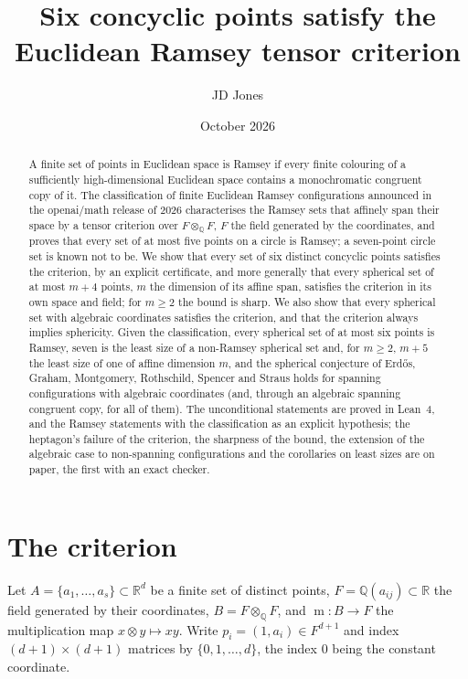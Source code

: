\documentclass[11pt]{article}
\title{Six concyclic points satisfy the Euclidean Ramsey tensor criterion}
\author{JD Jones}
\date{October 2026}
\theoremstyle{definition}
\theoremstyle{remark}
\newcommand{\R}{\mathbb{R}}
\newcommand{\Q}{\mathbb{Q}}
\newcommand{\B}{B}
\DeclareMathOperator{\m}{m}
\begin{document}
\maketitle

\begin{abstract}
A finite set of points in Euclidean space is Ramsey if every finite colouring of a sufficiently
high-dimensional Euclidean space contains a monochromatic congruent copy of it. The classification
of finite Euclidean Ramsey configurations announced in the openai/math release of 2026 characterises
the Ramsey sets that affinely span their space by a tensor criterion over $F \otimes_\Q F$, $F$ the
field generated by the coordinates, and proves that every set of at most five points on a circle is
Ramsey; a seven-point circle set is known not to be. We show that every set of six distinct
concyclic points satisfies the criterion, by an explicit certificate, and more generally that every
spherical set of at most $m + 4$ points, $m$ the dimension of its affine span, satisfies the
criterion in its own space and field; for $m \geq 2$ the bound is sharp. We also show that every spherical set with
algebraic coordinates satisfies the criterion, and that the criterion always implies sphericity.
Given the classification, every spherical set of at most six points is Ramsey, seven is the least
size of a non-Ramsey spherical set and, for $m \geq 2$, $m + 5$ the least size of one of affine dimension
$m$, and the
spherical conjecture of Erd\H{o}s, Graham, Montgomery, Rothschild, Spencer and Straus holds for
spanning configurations with algebraic coordinates (and, through an algebraic spanning congruent copy,
for all of them). The unconditional statements are proved in Lean~4, and the Ramsey statements with the
classification as an explicit hypothesis; the heptagon's failure of the criterion, the sharpness of the
bound, the extension of the algebraic case to non-spanning configurations and the corollaries on
least sizes are on paper, the first with an exact checker.
\end{abstract}

\section{The criterion}

Let $A = \{a_1, \dots, a_s\} \subset \R^d$ be a finite set of distinct points, $F = \Q(a_{ij}) \subset \R$
the field generated by their coordinates, $\B = F \otimes_\Q F$, and $\m \colon \B \to F$ the
multiplication map $x \otimes y \mapsto xy$. Write $p_i = (1, a_i) \in F^{d+1}$ and index
$(d+1) \times (d+1)$ matrices by $\{0, 1, \dots, d\}$, the index $0$ being the constant coordinate.
\end{document}

